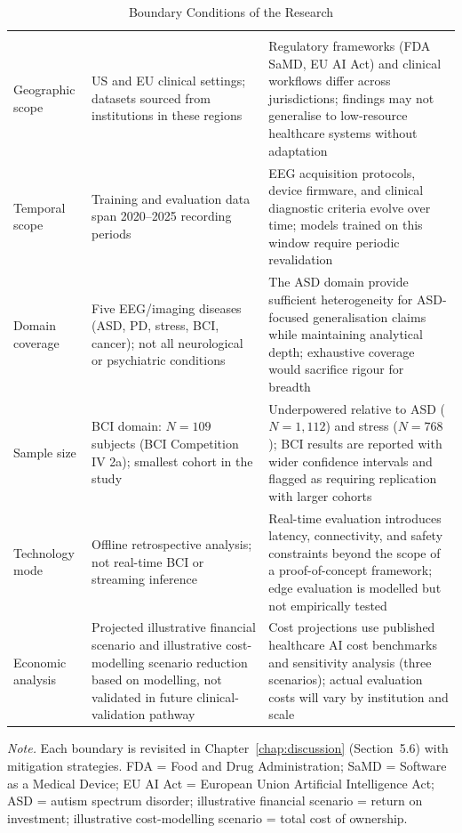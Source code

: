 {\tablestripes\tablefontsize

\begin{xltabular}{\textwidth}{@{} >{\raggedright\arraybackslash}p{2.8cm} L L @{}}
\caption[Boundary Conditions]{Boundary Conditions of the Research}\label{tab:boundary_conditions} \\
\toprule
{} &  &  \\
\midrule
\endfirsthead
\toprule
{} &  &  \\
\midrule
\endhead
\bottomrule
\endlastfoot
Geographic scope & US and EU clinical settings; datasets sourced from institutions in these regions & Regulatory frameworks (FDA SaMD, EU AI Act) and clinical workflows differ across jurisdictions; findings may not generalise to low-resource healthcare systems without adaptation \\
\addlinespace
Temporal scope & Training and evaluation data span 2020--2025 recording periods & EEG acquisition protocols, device firmware, and clinical diagnostic criteria evolve over time; models trained on this window require periodic revalidation \\
\addlinespace
Domain coverage & Five EEG/imaging diseases (ASD, PD, stress, BCI, cancer); not all neurological or psychiatric conditions & The ASD domain provide sufficient heterogeneity for ASD-focused generalisation claims while maintaining analytical depth; exhaustive coverage would sacrifice rigour for breadth \\
\addlinespace
Sample size & BCI domain: $N=109$ subjects (BCI Competition IV 2a); smallest cohort in the study & Underpowered relative to ASD ($N=1,112$) and stress ($N=768$); BCI results are reported with wider confidence intervals and flagged as requiring replication with larger cohorts \\
\addlinespace
Technology mode & Offline retrospective analysis; not real-time BCI or streaming inference & Real-time evaluation introduces latency, connectivity, and safety constraints beyond the scope of a proof-of-concept framework; edge evaluation is modelled but not empirically tested \\
\addlinespace
Economic analysis & Projected illustrative financial scenario and illustrative cost-modelling scenario reduction based on modelling, not validated in future clinical-validation pathway & Cost projections use published healthcare AI cost benchmarks and sensitivity analysis (three scenarios); actual evaluation costs will vary by institution and scale \\
\end{xltabular}}
\vspace{0.5em}
\noindent\textit{Note.} Each boundary is revisited in Chapter~\ref{chap:discussion} (Section~5.6) with mitigation strategies. FDA = Food and Drug Administration; SaMD = Software as a Medical Device; EU AI Act = European Union Artificial Intelligence Act; ASD = autism spectrum disorder;   illustrative financial scenario = return on investment; illustrative cost-modelling scenario = total cost of ownership.
\fi %


